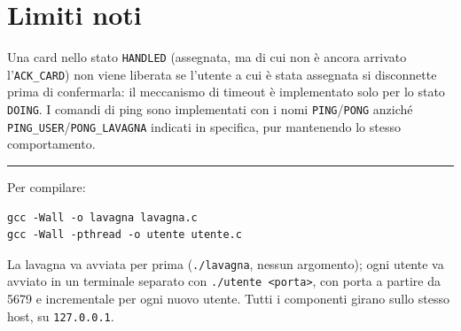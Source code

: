 \documentclass{article}
\begin{document}
\section{Limiti noti}
Una card nello stato \verb|HANDLED| (assegnata, ma di cui non è ancora arrivato l'\verb|ACK_CARD|) non viene liberata se l'utente a cui è stata assegnata si disconnette prima di confermarla: il meccanismo di timeout è implementato solo per lo stato \verb|DOING|. I comandi di ping sono implementati con i nomi \verb|PING|/\verb|PONG| anziché \verb|PING_USER|/\verb|PONG_LAVAGNA| indicati in specifica, pur mantenendo lo stesso comportamento.

\vfill
\hrule
\vspace{0.5em}
{\footnotesize
Per compilare:
\begin{verbatim}
gcc -Wall -o lavagna lavagna.c
gcc -Wall -pthread -o utente utente.c
\end{verbatim}
La lavagna va avviata per prima (\verb|./lavagna|, nessun argomento); ogni utente va avviato in un terminale separato con \verb|./utente <porta>|, con porta a partire da 5679 e incrementale per ogni nuovo utente. Tutti i componenti girano sullo stesso host, su \verb|127.0.0.1|.
}
\end{document}

